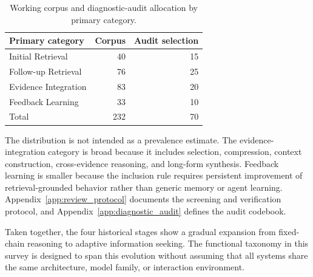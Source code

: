 \begin{table}[tbp]
\centering
\caption{Working corpus and diagnostic-audit allocation by primary category.}
\label{tab:corpus_distribution}
\small
\begin{tabular}{lrr}
\toprule
Primary category & Corpus & Audit selection \\
\midrule
Initial Retrieval & 40 & 15 \\
Follow-up Retrieval & 76 & 25 \\
Evidence Integration & 83 & 20 \\
Feedback Learning & 33 & 10 \\
\midrule
Total & 232 & 70 \\
\bottomrule
\end{tabular}
\end{table}

The distribution is not intended as a prevalence estimate. The evidence-integration category is broad because it includes selection, compression, context construction, cross-evidence reasoning, and long-form synthesis. Feedback learning is smaller because the inclusion rule requires persistent improvement of retrieval-grounded behavior rather than generic memory or agent learning. Appendix~\ref{app:review_protocol} documents the screening and verification protocol, and Appendix~\ref{app:diagnostic_audit} defines the audit codebook.

Taken together, the four historical stages show a gradual expansion from fixed-chain reasoning to adaptive information seeking. The functional taxonomy in this survey is designed to span this evolution without assuming that all systems share the same architecture, model family, or interaction environment.
